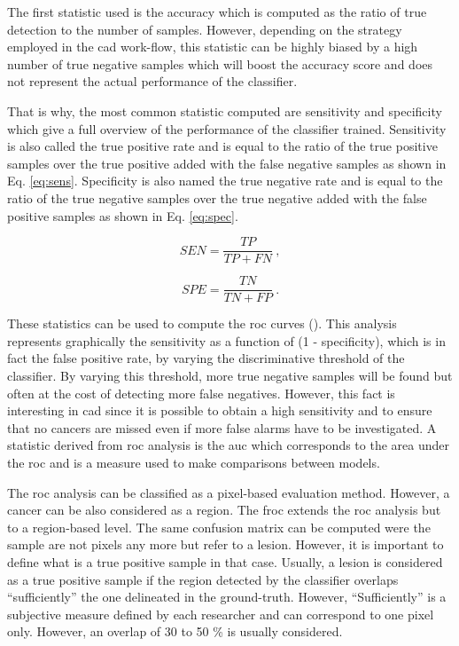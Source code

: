 The first statistic used is the accuracy which is computed as the ratio of true detection to the number of samples. However, depending on the strategy employed in the \ac{cad} work-flow, this statistic can be highly biased by a high number of true negative samples which will boost the accuracy score and does not represent the actual performance of the classifier.

That is why, the most common statistic computed are sensitivity and specificity which give a full overview of the performance of the classifier trained. Sensitivity is also called the true positive rate and is equal to the ratio of the true positive samples over the true positive added with the false negative samples as shown in Eq. \eqref{eq:sens}. Specificity is also named the true negative rate and is equal to the ratio of the true negative samples over the true negative added with the false positive samples as shown in Eq. \eqref{eq:spec}.

\begin{equation}
  SEN = \frac{TP}{TP+FN} \ ,
  \label{eq:sens}
\end{equation}

\begin{equation}
  SPE = \frac{TN}{TN+FP} \ .
  \label{eq:spec}
\end{equation}

These statistics can be used to compute the \acf{roc} curves (\cite{Metz2006}). This analysis represents graphically the sensitivity as a function of (1 - specificity), which is in fact the false positive rate, by varying the discriminative threshold of the classifier. By varying this threshold, more true negative samples will be found but often at the cost of detecting more false negatives. However, this fact is interesting in \ac{cad} since it is possible to obtain a high sensitivity and to ensure that no cancers are missed even if more false alarms have to be investigated. A statistic derived from \ac{roc} analysis is the \acf{auc} which corresponds to the area under the \ac{roc} and is a measure used to make comparisons between models.

The \ac{roc} analysis can be classified as a pixel-based evaluation method. However, a cancer can be also considered as a region. The \acf{froc} extends the \ac{roc} analysis but to a region-based level. The same confusion matrix can be computed were the sample are not pixels any more but refer to a lesion. However, it is important to define what is a true positive sample in that case. Usually, a lesion is considered as a true positive sample if the region detected by the classifier overlaps ``sufficiently'' the one delineated in the ground-truth. However, ``Sufficiently'' is a subjective measure defined by each researcher and can correspond to one pixel only. However, an overlap of 30 to 50 \% is usually considered.

